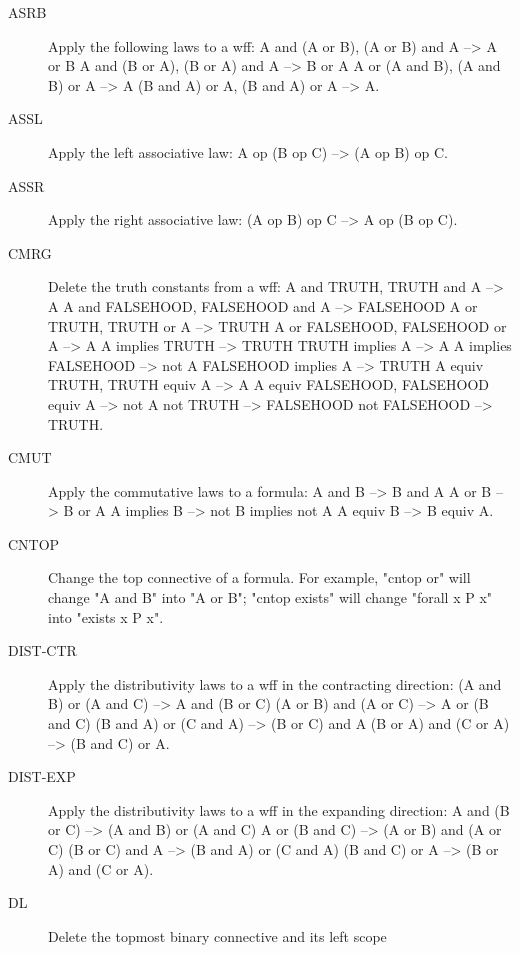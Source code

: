 \begin{description} 
\item[ASRB]  
Apply the following laws to a wff:
   A and (A or B), (A or B) and A --> A or B
   A and (B or A), (B or A) and A --> B or A
   A or (A and B), (A and B) or A --> A
   (B and A) or A, (B and A) or A --> A.

\item[ASSL]  
Apply the left associative law:
   A op (B op C) --> (A op B) op C.

\item[ASSR]  
Apply the right associative law:
   (A op B) op C --> A op (B op C).

\item[CMRG]  
Delete the truth constants from a wff:
   A and TRUTH, TRUTH and A --> A
   A and FALSEHOOD, FALSEHOOD and A --> FALSEHOOD
   A or TRUTH, TRUTH or A --> TRUTH
   A or FALSEHOOD, FALSEHOOD or A --> A
   A implies TRUTH --> TRUTH
   TRUTH implies A --> A
   A implies FALSEHOOD --> not A
   FALSEHOOD implies A --> TRUTH
   A equiv TRUTH, TRUTH equiv A --> A
   A equiv FALSEHOOD, FALSEHOOD equiv A --> not A
   not TRUTH --> FALSEHOOD
   not FALSEHOOD --> TRUTH.

\item[CMUT]  
Apply the commutative laws to a formula:
   A and B --> B and A
   A or B --> B or A
   A implies B --> not B implies not A
   A equiv B --> B equiv A.

\item[CNTOP]  
Change the top connective of a formula. For example,
"cntop or" will change "A and B" into "A or B";
"cntop exists" will change "forall x P x" into "exists x P x".

\item[DIST-CTR]  
Apply the distributivity laws to a wff in 
   the contracting direction:
  (A and B) or (A and C) --> A and (B or C)
  (A or B) and (A or C) --> A or (B and C)
  (B and A) or (C and A) --> (B or C) and A 
  (B or A) and (C or A) --> (B and C) or A.

\item[DIST-EXP]  
Apply the distributivity laws to a wff in 
   the expanding direction:
   A and (B or C) --> (A and B) or (A and C)
   A or (B and C) --> (A or B) and (A or C)
   (B or C) and A --> (B and A) or (C and A)
   (B and C) or A --> (B or A) and (C or A).

\item[DL]  
Delete the topmost binary connective and its left scope


\end{description}
